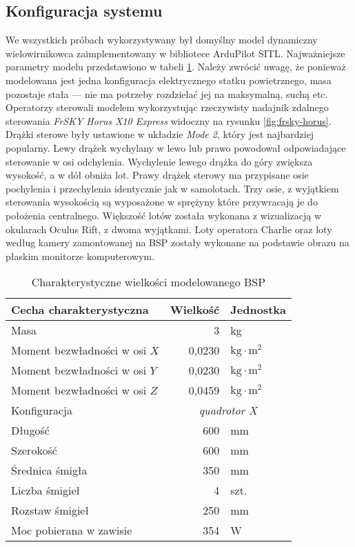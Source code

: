 \subsection{Konfiguracja systemu}
We wszystkich próbach wykorzystywany był domyślny model dynamiczny wielowirnikowca zaimplementowany w bibliotece ArduPilot SITL\cite{sitl-model}. Najważniejsze parametry modelu przedstawiono w tabeli \ref{tab:sitl-model}. Należy zwrócić uwagę, że ponieważ modelowana jest jedna konfiguracja elektrycznego statku powietrznego, masa pozostaje stała --- nie ma potrzeby rozdzielać jej na maksymalną, suchą etc. Operatorzy sterowali modelem wykorzystując rzeczywisty nadajnik zdalnego sterowania \emph{FrSKY Horus X10 Express} widoczny na rysunku \ref{fig:frsky-horus}. Drążki sterowe były ustawione w układzie \emph{Mode 2}, który jest najbardziej popularny\cite{mcnabb2021}. Lewy drążek wychylany w lewo lub prawo powodował odpowiadające sterowanie w osi odchylenia. Wychylenie lewego drążka do góry zwiększa wysokość, a w dół obniża lot. Prawy drążek sterowy ma przypisane osie pochylenia i przechylenia identycznie jak w samolotach. Trzy osie, z wyjątkiem sterowania wysokością są wyposażone w sprężyny które przywracają je do położenia centralnego. Większość lotów została wykonana z wizualizacją w okularach Oculus Rift, z dwoma wyjątkami. Loty operatora Charlie oraz loty według kamery zamontowanej na BSP zostały wykonane na podstawie obrazu na płaskim monitorze komputerowym.
\begin{table}[!h] \centering
    \caption{Charakterystyczne wielkości modelowanego BSP}
    \label{tab:sitl-model}

    \begin{tabular}{|l | r|l |}
    \hline
    Cecha charakterystyczna & Wielkość & Jednostka \\ \hline \hline
    Masa & 3 & kg \\ \hline
    Moment bezwładności w osi $ X $ & 0,0230 & $ \text{kg}\cdot\text{m}^2 $ \\ \hline
    Moment bezwładności w osi $ Y $ & 0,0230 & $ \text{kg}\cdot\text{m}^2 $ \\ \hline
    Moment bezwładności w osi $ Z $ & 0,0459 & $ \text{kg}\cdot\text{m}^2 $ \\ \hline
    Konfiguracja & \multicolumn{2}{c|}{\emph{quadrotor X}} \\ \hline
    Długość & 600 & mm \\ \hline
    Szerokość & 600 & mm \\ \hline
    Średnica śmigła & 350 & mm \\ \hline
    Liczba śmigieł & 4 & szt. \\ \hline
    Rozstaw śmigieł & 250 & mm \\ \hline
    Moc pobierana w zawisie & 354 & W \\ \hline
  \end{tabular}
\end{table}

